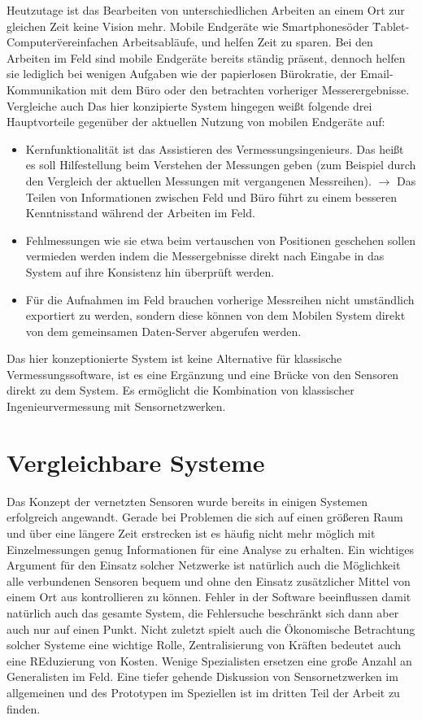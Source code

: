 Heutzutage ist das Bearbeiten von unterschiedlichen Arbeiten an einem Ort zur gleichen Zeit keine Vision mehr. Mobile Endgeräte wie \"Smartphones\" oder \"Tablet-Computer\" vereinfachen Arbeitsabläufe, und helfen Zeit zu sparen. Bei den Arbeiten im Feld sind mobile Endgeräte bereits ständig präsent, dennoch helfen sie lediglich bei wenigen Aufgaben wie der papierlosen Bürokratie, der Email-Kommunikation mit dem Büro oder den betrachten vorheriger Messerergebnisse. Vergleiche auch \citep{breunig_entwicklung_2003} \citep{breunig_vision_2003} Das hier konzipierte System hingegen weißt folgende drei Hauptvorteile gegenüber der aktuellen Nutzung von mobilen Endgeräte auf:
\begin{itemize}
\item Kernfunktionalität ist das Assistieren des Vermessungsingenieurs. Das heißt es soll Hilfestellung beim Verstehen der Messungen geben (zum Beispiel durch den Vergleich der aktuellen Messungen mit vergangenen Messreihen). $\rightarrow$ Das Teilen von Informationen zwischen Feld und Büro führt zu einem besseren Kenntnisstand während der Arbeiten im Feld.
\item Fehlmessungen wie sie etwa beim vertauschen von Positionen geschehen sollen vermieden werden indem die Messergebnisse direkt nach Eingabe in das System auf ihre Konsistenz hin überprüft werden.
\item Für die Aufnahmen im Feld brauchen vorherige Messreihen nicht umständlich exportiert zu werden, sondern diese können von dem Mobilen System direkt von dem gemeinsamen Daten-Server abgerufen werden.
\end{itemize}
Das hier konzeptionierte System ist keine Alternative für klassische Vermessungssoftware, ist es eine Ergänzung und eine Brücke von den Sensoren direkt zu dem System. Es ermöglicht die Kombination von klassischer Ingenieurvermessung mit Sensornetzwerken.


\section{Vergleichbare Systeme}
Das Konzept der vernetzten Sensoren wurde bereits in einigen Systemen erfolgreich angewandt. Gerade bei Problemen die sich auf einen größeren Raum und über eine längere Zeit erstrecken ist es häufig nicht mehr möglich mit Einzelmessungen genug Informationen für eine Analyse zu erhalten. Ein wichtiges Argument für den Einsatz solcher Netzwerke ist natürlich auch die Möglichkeit alle verbundenen Sensoren bequem und ohne den Einsatz zusätzlicher Mittel von einem Ort aus kontrollieren zu können. Fehler in der Software beeinflussen damit natürlich auch das gesamte System, die Fehlersuche beschränkt sich dann aber auch nur auf einen Punkt. Nicht zuletzt spielt auch die Ökonomische Betrachtung solcher Systeme eine wichtige Rolle, Zentralisierung von Kräften bedeutet auch eine REduzierung von Kosten. Wenige Spezialisten ersetzen eine große Anzahl an Generalisten im Feld. Eine tiefer gehende Diskussion von Sensornetzwerken im allgemeinen und des Prototypen im Speziellen ist im dritten Teil der Arbeit zu finden.

